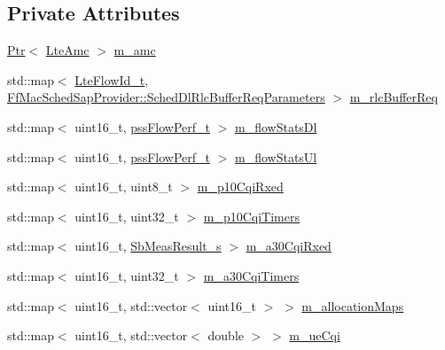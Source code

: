 \subsection*{Private Attributes}
\begin{DoxyCompactItemize}
\item 
\hyperlink{classns3_1_1Ptr}{Ptr}$<$ \hyperlink{classns3_1_1LteAmc}{Lte\+Amc} $>$ \hyperlink{classns3_1_1PssFfMacScheduler_a0cbf5421430268701ab8a313ab912785}{m\+\_\+amc}
\item 
std\+::map$<$ \hyperlink{structns3_1_1LteFlowId__t}{Lte\+Flow\+Id\+\_\+t}, \hyperlink{structns3_1_1FfMacSchedSapProvider_1_1SchedDlRlcBufferReqParameters}{Ff\+Mac\+Sched\+Sap\+Provider\+::\+Sched\+Dl\+Rlc\+Buffer\+Req\+Parameters} $>$ \hyperlink{classns3_1_1PssFfMacScheduler_af66c823e9ee8ce17084dff35ce128191}{m\+\_\+rlc\+Buffer\+Req}
\item 
std\+::map$<$ uint16\+\_\+t, \hyperlink{structns3_1_1pssFlowPerf__t}{pss\+Flow\+Perf\+\_\+t} $>$ \hyperlink{classns3_1_1PssFfMacScheduler_add144474dc7bd9d89b93ff14bc8d27c9}{m\+\_\+flow\+Stats\+Dl}
\item 
std\+::map$<$ uint16\+\_\+t, \hyperlink{structns3_1_1pssFlowPerf__t}{pss\+Flow\+Perf\+\_\+t} $>$ \hyperlink{classns3_1_1PssFfMacScheduler_a352297bd379991aba26a724661058120}{m\+\_\+flow\+Stats\+Ul}
\item 
std\+::map$<$ uint16\+\_\+t, uint8\+\_\+t $>$ \hyperlink{classns3_1_1PssFfMacScheduler_a268235ec4bf4d7e3a75840dec54bf22d}{m\+\_\+p10\+Cqi\+Rxed}
\item 
std\+::map$<$ uint16\+\_\+t, uint32\+\_\+t $>$ \hyperlink{classns3_1_1PssFfMacScheduler_a687c4283769d0e08724b80d4f5a5cf77}{m\+\_\+p10\+Cqi\+Timers}
\item 
std\+::map$<$ uint16\+\_\+t, \hyperlink{structns3_1_1SbMeasResult__s}{Sb\+Meas\+Result\+\_\+s} $>$ \hyperlink{classns3_1_1PssFfMacScheduler_ab1bc511b7c55ead9b2e8ff1e0d4b0e3b}{m\+\_\+a30\+Cqi\+Rxed}
\item 
std\+::map$<$ uint16\+\_\+t, uint32\+\_\+t $>$ \hyperlink{classns3_1_1PssFfMacScheduler_aebfb8f26fbeb4ab75f566ce974f2cb65}{m\+\_\+a30\+Cqi\+Timers}
\item 
std\+::map$<$ uint16\+\_\+t, std\+::vector$<$ uint16\+\_\+t $>$ $>$ \hyperlink{classns3_1_1PssFfMacScheduler_ad06e7461edc613eb44a4a9c474915022}{m\+\_\+allocation\+Maps}
\item 
std\+::map$<$ uint16\+\_\+t, std\+::vector$<$ double $>$ $>$ \hyperlink{classns3_1_1PssFfMacScheduler_abd1f917911a86bfd576e93ec67d7b8b2}{m\+\_\+ue\+Cqi}
\item 

\end{DoxyCompactItemize}

